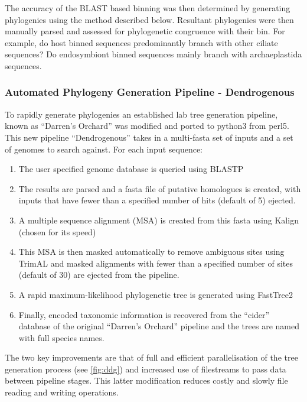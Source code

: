 The accuracy of the BLAST based binning was then determined by generating phylogenies
using the method described below. Resultant phylogenies were then manually
parsed and assessed for phylogenetic congruence with their bin.
For example, do host binned sequences predominantly branch with other ciliate sequences?
Do endosymbiont binned sequences mainly branch with archaeplastida sequences. 

\subsubsection{Automated Phylogeny Generation Pipeline - Dendrogenous}

To rapidly generate phylogenies an established lab tree generation pipeline, known as ``Darren's Orchard'' 
\citep{Richards2009g} was modified and ported to python3 from perl5.  This new pipeline ``Dendrogenous'' 
takes in a multi-fasta set of inputs and a set of genomes to search against.
For each input sequence:
\begin{enumerate} 
    \item The user specified genome database is queried using BLASTP
    \item The results are parsed and a fasta file of putative homologues is created, with inputs that have fewer than a specified 
        number of hits (default of 5) ejected.
    \item A multiple sequence alignment (MSA) is created from this fasta using Kalign (chosen for its speed) \citep{Lassmann2009}
    \item This MSA is then masked automatically to remove ambiguous sites using TrimAL \citep{Capella-Gutierrez2009} and masked alignments
        with fewer than a specified number of sites (default of 30) are ejected from the pipeline.
    \item A rapid maximum-likelihood phylogenetic tree is generated using FastTree2 \citep{Price2010}
    \item Finally, encoded taxonomic information is recovered from the ``cider'' database of the original ``Darren's Orchard'' pipeline 
        and the trees are named with full species names.
\end{enumerate}
The two key improvements are that of full and efficient parallelisation of the tree generation process (see \ref{fig:ddg})
and increased use of filestreams to pass data between pipeline stages.  This latter modification reduces costly and slowly
file reading and writing operations.

